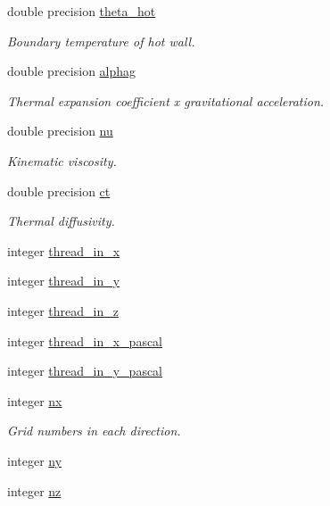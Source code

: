 \begin{DoxyCompactItemize}
double precision \hyperlink{namespaceglobal_a63b846fbcd5aedd45f92a0b1eb972244}{theta\+\_\+hot}
\begin{DoxyCompactList}\small\item\em Boundary temperature of hot wall. \end{DoxyCompactList}\item 
double precision \hyperlink{namespaceglobal_abe54a711bf9d8c30a6debfb651bdf47d}{alphag}
\begin{DoxyCompactList}\small\item\em Thermal expansion coefficient x gravitational acceleration. \end{DoxyCompactList}\item 
double precision \hyperlink{namespaceglobal_a48babc9c7f07053917ca1392e7a7b721}{nu}
\begin{DoxyCompactList}\small\item\em Kinematic viscosity. \end{DoxyCompactList}\item 
double precision \hyperlink{namespaceglobal_acf5521de662915885b6a73718cd6314b}{ct}
\begin{DoxyCompactList}\small\item\em Thermal diffusivity. \end{DoxyCompactList}\item 
integer \hyperlink{namespaceglobal_a33db542cca17d8c3a156e90d31d8abe5}{thread\+\_\+in\+\_\+x}
\item 
integer \hyperlink{namespaceglobal_a2694e42b57b63e348f472d5a59bfe0fb}{thread\+\_\+in\+\_\+y}
\item 
integer \hyperlink{namespaceglobal_a1f39f066a0ed398d1e3e56d13d092718}{thread\+\_\+in\+\_\+z}
\item 
integer \hyperlink{namespaceglobal_a0c53f9dfde5486b01023d0c9479db29c}{thread\+\_\+in\+\_\+x\+\_\+pascal}
\item 
integer \hyperlink{namespaceglobal_af395b143d44c9d28517e64a695920dda}{thread\+\_\+in\+\_\+y\+\_\+pascal}
\end{DoxyCompactItemize}
\textbf{ }\par
\begin{DoxyCompactItemize}
\item 
integer \hyperlink{namespaceglobal_a4ba10a6dbbcebb68e0d5e36a6c291898}{nx}
\begin{DoxyCompactList}\small\item\em Grid numbers in each direction. \end{DoxyCompactList}\item 
integer \hyperlink{namespaceglobal_a12dd7ca24c7675f31e6de07b1769991c}{ny}
\item 
integer \hyperlink{namespaceglobal_ab8d7436a6037d4c1b7248107a2f07d76}{nz}
\end{DoxyCompactItemize}

